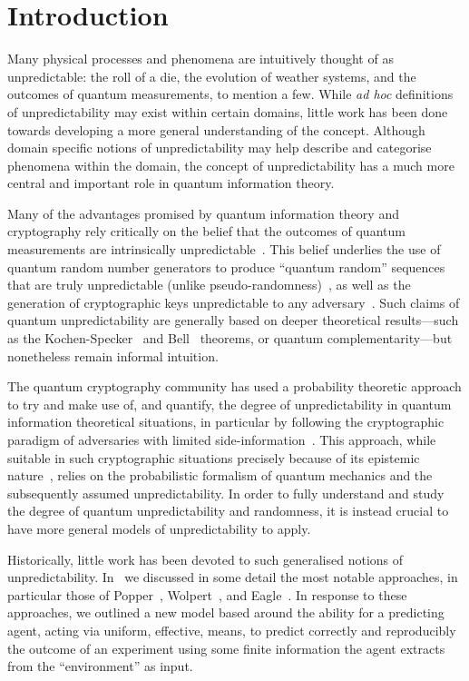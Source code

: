 \documentclass[information,article,submit,moreauthors,pdftex,12pt,a4paper]{mdpi}
\theoremstyle{mdpi}
\newcounter{ex}
\newcounter{re}
\theoremstyle{mdpidefinition}
\begin{document}
\section{Introduction}

Many physical processes and phenomena are intuitively thought of as unpredictable: the roll of a die, the evolution of weather systems, and the outcomes of quantum measurements, to mention a few.
While \emph{ad hoc} definitions of unpredictability may exist within certain domains, little work has been done towards developing a more general understanding of the concept.
Although domain specific notions of unpredictability may help describe and categorise phenomena within the domain, the concept of unpredictability has a much more central and important role in quantum information theory.


Many of the advantages promised by quantum information theory and cryptography rely critically on the belief that the outcomes of quantum measurements are intrinsically unpredictable~\cite{zeil-05_nature_ofQuantum,Fitzsimons:2013kk}.
This belief underlies the use of quantum random number generators to produce ``quantum random'' sequences that are truly unpredictable (unlike pseudo-randomness)~\cite{stefanov-2000}, as well as the generation of cryptographic keys unpredictable to any adversary~\cite{Fitzsimons:2013kk}.
Such claims of quantum unpredictability are generally based on deeper theoretical results---such as the Kochen-Specker~\cite{kochen1} and Bell~\cite{bell-66} theorems, or quantum complementarity---but nonetheless remain informal intuition.

The quantum cryptography community has used a probability theoretic approach to try and make use of, and quantify, the degree of unpredictability in quantum information theoretical situations, in particular by following the cryptographic paradigm of adversaries with limited side-information~\cite{Berta:2010vn}.
This approach, while suitable in such cryptographic situations precisely because of its epistemic nature~\cite{dynes:031109}, relies on the probabilistic formalism of quantum mechanics and the subsequently assumed unpredictability.
In order to fully understand and study the degree of quantum unpredictability and randomness, it is instead crucial to have more general models of unpredictability to apply.

Historically, little work has been devoted to such generalised notions of unpredictability.
In~\cite{DBLP:conf/birthday/AbbottCS15} we discussed in some detail the most notable approaches, in particular those of Popper~\cite{popper-50i}, Wolpert~\cite{Wolpert:2008aa}, and Eagle~\cite{Eagle:2005ys}.
In response to these approaches, we outlined a new model based around the ability for a predicting agent, acting via uniform, effective, means, to predict correctly and reproducibly the outcome of an experiment using some finite information the agent extracts from the ``environment'' as input.
\end{document}

